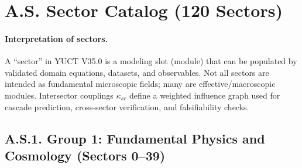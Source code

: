 \documentclass[13pt,a4paper]{article}
\begin{document}
	
	\tableofcontents
	\newpage
	\section*{A.S. Sector Catalog (120 Sectors)}
	\label{sec:sector-catalog}
	\paragraph{Interpretation of sectors.}
	A ``sector'' in YUCT V35.0 is a modeling slot (module) that can be populated by validated domain equations, datasets, and observables. Not all sectors are intended as fundamental microscopic fields; many are effective/macroscopic modules. Intersector couplings $\kappa_{sr}$ define a weighted influence graph used for cascade prediction, cross-sector verification, and falsifiability checks.
	
	\subsection*{A.S.1. Group 1: Fundamental Physics and Cosmology (Sectors 0--39)}
	
\end{document}

